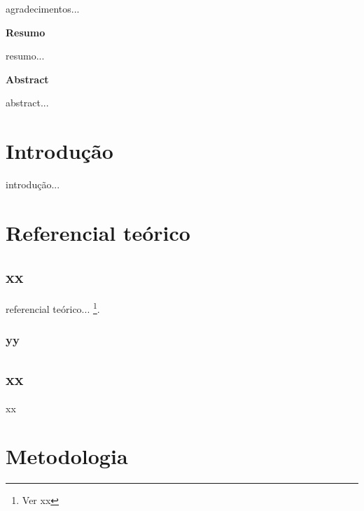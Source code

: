 \documentclass[12pt]{article}
\begin{document}
\thispagestyle{empty}

\newpage
{}
\vspace{1pt}

agradecimentos...

\thispagestyle{empty}

\newpage
\begin{center}
\textbf{\normalsize Resumo}
\end{center}
\vspace{1pt}

resumo...

\thispagestyle{empty}

\newpage
\begin{center}
\textbf{\normalsize Abstract}
\end{center}
\vspace{1pt}

abstract...

\thispagestyle{empty}

\newpage
\tableofcontents
\thispagestyle{empty}

\newpage
\section{Introdução}

introdução...

\newpage
\section{Referencial teórico}

\subsection{xx}

referencial teórico... \footnote{Ver xx}.

\subsubsection{yy}

\newpage
\subsection{xx}

xx

\newpage
\section{Metodologia}
\end{document}
